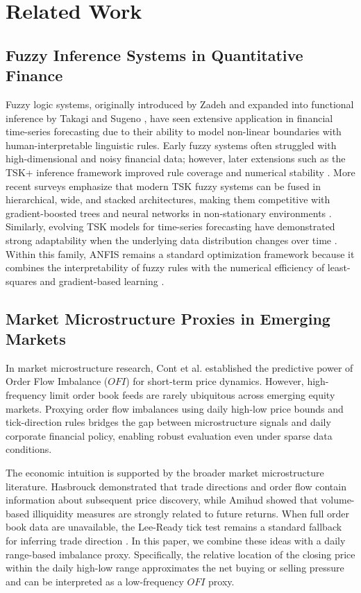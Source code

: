 \documentclass[pdflatex,sn-mathphys-num]{sn-jnl}
\theoremstyle{thmstyleone}
\theoremstyle{thmstyletwo}
\theoremstyle{thmstylethree}
\begin{document}
\section{Related Work}\label{sec2}

\subsection{Fuzzy Inference Systems in Quantitative Finance}

Fuzzy logic systems, originally introduced by Zadeh \cite{zadeh1965} and expanded into functional inference by Takagi and Sugeno \cite{takagi1985}, have seen extensive application in financial time-series forecasting due to their ability to model non-linear boundaries with human-interpretable linguistic rules. Early fuzzy systems often struggled with high-dimensional and noisy financial data; however, later extensions such as the TSK+ inference framework improved rule coverage and numerical stability \cite{li2018}. More recent surveys emphasize that modern TSK fuzzy systems can be fused in hierarchical, wide, and stacked architectures, making them competitive with gradient-boosted trees and neural networks in non-stationary environments \cite{zhang2024}. Similarly, evolving TSK models for time-series forecasting have demonstrated strong adaptability when the underlying data distribution changes over time \cite{alves2024}. Within this family, ANFIS remains a standard optimization framework because it combines the interpretability of fuzzy rules with the numerical efficiency of least-squares and gradient-based learning \cite{jang1993}.

\subsection{Market Microstructure Proxies in Emerging Markets}

In market microstructure research, Cont et al. \cite{cont2014} established the predictive power of Order Flow Imbalance ($OFI$) for short-term price dynamics. However, high-frequency limit order book feeds are rarely ubiquitous across emerging equity markets. Proxying order flow imbalances using daily high-low price bounds and tick-direction rules bridges the gap between microstructure signals and daily corporate financial policy, enabling robust evaluation even under sparse data conditions.

The economic intuition is supported by the broader market microstructure literature. Hasbrouck \cite{hasbrouck1991} demonstrated that trade directions and order flow contain information about subsequent price discovery, while Amihud \cite{amihud2002} showed that volume-based illiquidity measures are strongly related to future returns. When full order book data are unavailable, the Lee-Ready tick test remains a standard fallback for inferring trade direction \cite{leeready1991}. In this paper, we combine these ideas with a daily range-based imbalance proxy. Specifically, the relative location of the closing price within the daily high-low range approximates the net buying or selling pressure and can be interpreted as a low-frequency $OFI$ proxy.
\end{document}
